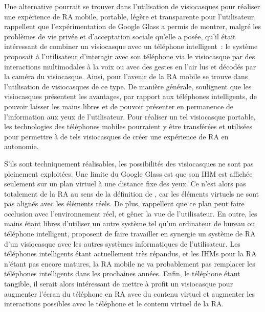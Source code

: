 Une alternative pourrait se trouver dans l'utilisation de visiocasques pour réaliser une expérience de RA mobile, portable, légère et transparente pour l'utilisateur. \citet{KoelleKranzMoeller2015} rappellent que l'expérimentation de Google Glass a permis de montrer, malgré les problèmes de vie privée et d'acceptation sociale qu'elle a posée, qu'il était intéressant de combiner un visiocasque avec un téléphone intelligent~: le système proposait à l'utilisateur d'interagir avec son téléphone via le visiocasque par des interactions multimodales à la voix ou avec des gestes en l'air lus et décodés par la caméra du visiocasque. Ainsi, pour \citet{HuangHuiPeyloEtAl2013} l'avenir de la RA mobile se trouve dans l'utilisation de visiocasques de ce type. De manière générale, \citet{SerranoEnsYangEtAl2015} soulignent que les visiocasques présentent les avantages, par rapport aux téléphones intelligents, de pouvoir laisser les mains libres et de pouvoir présenter en permanence de l'information aux yeux de l'utilisateur. Pour réaliser un tel visiocasque portable, les technologies des téléphones mobiles pourraient y être transférées et utilisées pour permettre à de tels visiocasques de créer une expérience de RA en autonomie.

S'ils sont techniquement réalisables, les possibilités des visiocasques ne sont pas pleinement exploitées. Une limite du Google Glass est que son IHM est affichée seulement sur un plan virtuel à une distance fixe des yeux. Ce n'est alors pas totalement de la RA au sens de la définition de \citet{AzumaBaillotBehringerEtAl2001}, car les éléments virtuels ne sont pas alignés avec les éléments réels. De plus, \citet{SerranoEnsYangEtAl2015} rappellent que ce plan peut faire occlusion avec l'environnement réel, et gêner la vue de l'utilisateur. En outre, les mains étant libres d'utiliser un autre système tel qu'un ordinateur de bureau ou téléphone intelligent, \citet{SerranoEnsYangEtAl2015b} proposent de faire travailler en synergie un système de RA d'un visiocasque avec les autres systèmes informatiques de l'utilisateur. Les téléphones intelligents étant actuellement très répandus, et les IHMs pour la RA n'étant pas encore matures, la RA mobile ne va probablement pas remplacer les téléphones intelligents dans les prochaines années. Enfin, le téléphone étant tangible, il serait alors intéressant de mettre à profit un visiocasque pour augmenter l'écran du téléphone en RA avec du contenu virtuel et augmenter les interactions possibles avec le téléphone et le contenu virtuel de la RA. 

